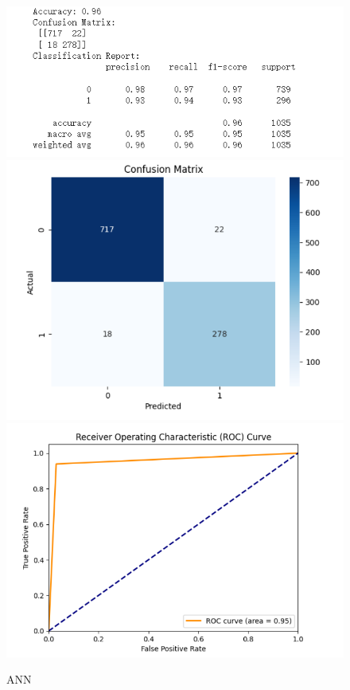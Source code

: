 \documentclass[conference]{IEEEtran}
\begin{document}
\begin{figure}[h]
\centering
    \includegraphics[width=.4\textwidth]{ANN/ANN1.png}
    \includegraphics[width=.4\textwidth]{ANN/ANN2.png}
    \\[\smallskipamount]
    \includegraphics[width=.4\textwidth]{ANN/ANN3.png}
    \caption{ANN}\label{ANN}
\end{figure}
\end{document}
